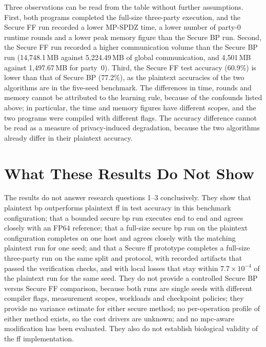 Three observations can be read from the table without further assumptions. First, both programs completed the full-size three-party execution, and the Secure FF run recorded a lower MP-SPDZ time, a lower number of party-0 runtime rounds and a lower peak memory figure than the Secure BP run. Second, the Secure FF run recorded a higher communication volume than the Secure BP run (14{,}748.1\,MB against 5{,}224.49\,MB of global communication, and 4{,}501\,MB against 1{,}497.67\,MB for party~0). Third, the Secure FF test accuracy (60.9\%) is lower than that of Secure BP (77.2\%), as the plaintext accuracies of the two algorithms are in the five-seed benchmark. The differences in time, rounds and memory cannot be attributed to the learning rule, because of the confounds listed above; in particular, the time and memory figures have different scopes, and the two programs were compiled with different flags. The accuracy difference cannot be read as a measure of privacy-induced degradation, because the two algorithms already differ in their plaintext accuracy.

\FloatBarrier
\section{What These Results Do Not Show}\label{sec:res-notshow}
The results do not answer research questions 1--3 conclusively. They show that plaintext \ac{bp} outperforms plaintext \ac{ff} in test accuracy in this benchmark configuration; that a bounded secure \ac{bp} run executes end to end and agrees closely with an FP64 reference; that a full-size secure \ac{bp} run on the plaintext configuration completes on one host and agrees closely with the matching plaintext run for one seed; and that a Secure \ac{ff} prototype completes a full-size three-party run on the same split and protocol, with recorded artifacts that passed the verification checks, and with local losses that stay within $7.7\times10^{-4}$ of the plaintext run for the same seed. They do not provide a controlled Secure BP versus Secure FF comparison, because both runs are single seeds with different compiler flags, measurement scopes, workloads and checkpoint policies; they provide no variance estimate for either secure method; no per-operation profile of either method exists, so the cost drivers are unknown; and no \ac{mpc}-aware modification has been evaluated. They also do not establish biological validity of the \ac{ff} implementation.
